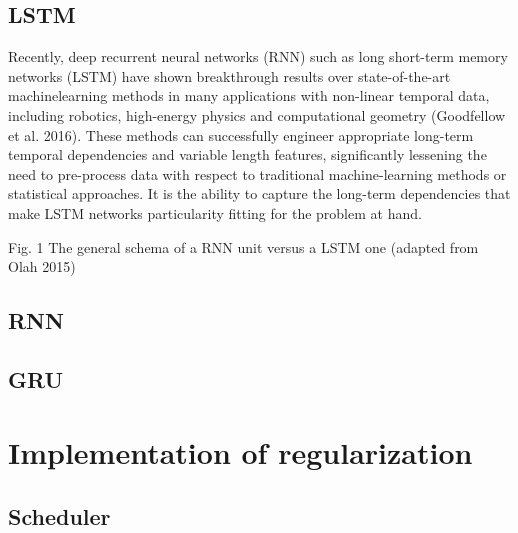 \subsection{LSTM}
Recently, deep recurrent neural networks (RNN) such as long short-term memory networks (LSTM) have shown breakthrough results over state-of-the-art machinelearning methods in many applications with non-linear temporal data, including robotics, high-energy physics and computational geometry (Goodfellow et al. 2016). These methods can successfully engineer appropriate long-term temporal dependencies and variable length features, significantly lessening the need to pre-process data with respect to traditional machine-learning methods or statistical approaches. It is the ability to capture the long-term dependencies that make LSTM networks particularity fitting for the problem at hand. 

Fig. 1 The general schema of a RNN unit versus a LSTM one (adapted from Olah 2015)



\subsection{RNN}

\subsection{GRU}

\section{Implementation of regularization}

\subsection{Scheduler}

